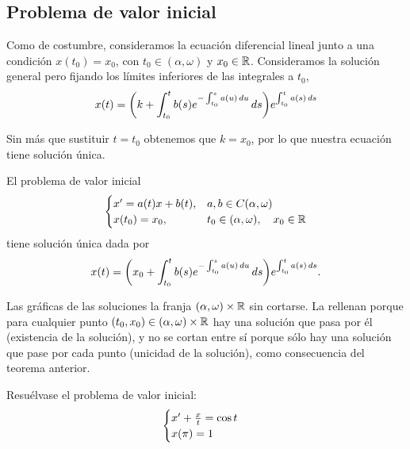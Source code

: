\documentclass[../ecuaciones_diferenciales.tex]{subfiles}
\begin{document}
\subsection{Problema de valor inicial}

Como de costumbre, consideramos la ecuación diferencial lineal junto a una
condición \(x(t_0) = x_0\), con \(t_0 \in (\alpha, \omega)\) y \(x_0 \in \mathbb{R}\).
Consideramos la solución general pero fijando los límites inferiores de las
integrales a \(t_0\),
\[x(t) = \parens{k + \int_{t_0}^t b(s) e^{-\int_{t_0}^s a(u) \dif u} \dif s}
	e^{\int_{t_0}^t a(s) \dif s}\]

Sin más que sustituir \(t = t_0\) obtenemos que \(k = x_0\), por lo que
nuestra ecuación tiene solución única.

\begin{theorem}
	El problema de valor inicial
	\[\begin{cases}
			x' = a(t)x + b(t), & a, b \in C(\alpha, \omega) \\
			x(t_0) = x_0, 	  & t_0 \in (\alpha, \omega), \quad x_0 \in \mathbb{R}\end{cases}\]
	tiene solución única dada por
	\[x(t) =
		\parens{x_0 + \int_{t_0}^t b(s) e^{-\int_{t_0}^s a(u) \dif u} \dif s}
		e^{\int_{t_0}^t a(s) \dif s}.\]
\end{theorem}

Las gráficas de las soluciones  la franja
\((\alpha, \omega) \times \mathbb{R}\) sin cortarse. La rellenan porque para cualquier
punto \((t_0, x_0) \in (\alpha, \omega) \times \mathbb{R}\) hay una solución que pasa
por él (existencia de la solución), y no se cortan entre sí porque sólo hay una
solución que pase por cada punto (unicidad de la solución), como consecuencia
del teorema anterior.

\begin{example}
	Resuélvase el problema de valor inicial:
	\[\begin{cases}
			x' + \frac{x}{t} = \cos t \\
			x(\pi) = 1\end{cases}\]
\end{example}
\end{document}
